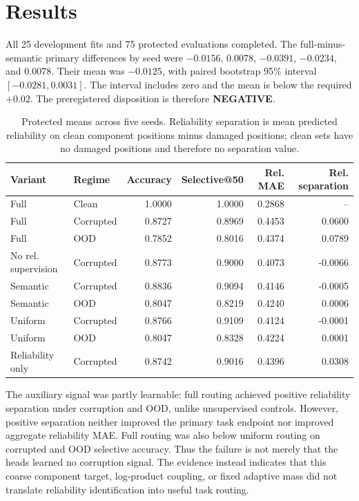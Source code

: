 \documentclass[10pt]{article}
\begin{document}
\section{Results}
All 25 development fits and 75 protected evaluations completed. The full-minus-semantic
primary differences by seed were $-0.0156$, $0.0078$, $-0.0391$, $-0.0234$, and $0.0078$.
Their mean was $-0.0125$, with paired bootstrap 95\% interval $[-0.0281,0.0031]$.
The interval includes zero and the mean is below the required $+0.02$. The preregistered
disposition is therefore \textbf{NEGATIVE}.

\begin{table}[H]
\centering
\small
\begin{tabular}{llrrrr}
\toprule
Variant & Regime & Accuracy & Selective@50 & Rel. MAE & Rel. separation\\
\midrule
Full & Clean & 1.0000 & 1.0000 & 0.2868 & --\\
Full & Corrupted & 0.8727 & 0.8969 & 0.4453 & 0.0600\\
Full & OOD & 0.7852 & 0.8016 & 0.4374 & 0.0789\\
No rel. supervision & Corrupted & 0.8773 & 0.9000 & 0.4073 & -0.0066\\
Semantic & Corrupted & 0.8836 & 0.9094 & 0.4146 & -0.0005\\
Semantic & OOD & 0.8047 & 0.8219 & 0.4240 & 0.0006\\
Uniform & Corrupted & 0.8766 & 0.9109 & 0.4124 & -0.0001\\
Uniform & OOD & 0.8047 & 0.8328 & 0.4224 & 0.0001\\
Reliability only & Corrupted & 0.8742 & 0.9016 & 0.4396 & 0.0308\\
\bottomrule
\end{tabular}
\caption{Protected means across five seeds. Reliability separation is mean predicted
reliability on clean component positions minus damaged positions; clean sets have no
damaged positions and therefore no separation value.}
\label{tab:results}
\end{table}

The auxiliary signal was partly learnable: full routing achieved positive reliability
separation under corruption and OOD, unlike unsupervised controls. However, positive
separation neither improved the primary task endpoint nor improved aggregate reliability
MAE. Full routing was also below uniform routing on corrupted and OOD selective accuracy.
Thus the failure is not merely that the heads learned no corruption signal. The evidence
instead indicates that this coarse component target, log-product coupling, or fixed adaptive
mass did not translate reliability identification into useful task routing.
\end{document}
